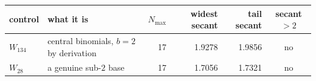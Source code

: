 \begin{tabular}{llrrrc}
\toprule
control & what it is & $N_{\max}$ & widest secant & tail secant & secant $>2$ \\
\midrule
$W_{134}$ & central binomials, $b=2$ by derivation & 17 & 1.9278 & 1.9856 & no \\
$W_{28}$ & a genuine sub-$2$ base & 17 & 1.7056 & 1.7321 & no \\
\bottomrule
\end{tabular}
